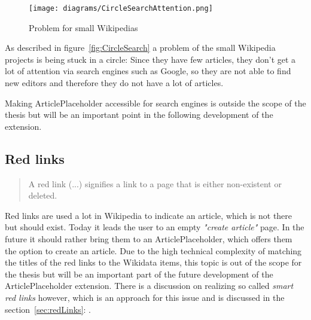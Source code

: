 \noindent\begin{minipage}{.4\textwidth}
	\begin{figure}[H]\label{fig:CircleSearch}
		\texttt{[image: diagrams/CircleSearchAttention.png]}
		\caption{Problem for small Wikipedias}
		\label{diagramCircleSearch}
	\end{figure}
	\hspace*{1cm}
\end{minipage}
\hfill
\begin{minipage}{0.5\textwidth}
		As described in figure~\ref{fig:CircleSearch} a problem of the small Wikipedia projects is being stuck in a circle: Since they have few articles, they don't get a lot of attention via search engines such as Google, so they are not able to find new editors and therefore they do not have a lot of articles.
\end{minipage}
\newline
Making ArticlePlaceholder accessible for search engines is outside the scope of the thesis but will be an important point in the following development of the extension. 

\subsection{Red links}
\begin{quotation}
A red link (...) signifies a link to a page that is either non-existent or deleted. 
\end{quotation} %

Red links are used a lot in Wikipedia to indicate an article, which is not there but should exist. Today it leads the user to an empty \textit{"create article"} page. In the future it should rather bring them to an ArticlePlaceholder, which offers them the option to create an article. Due to the high technical complexity of matching the titles of the red links to the Wikidata items, this topic is out of the scope for the thesis but will be an important part of the future development of the ArticlePlaceholder extension. There is a discussion on realizing so called \textit{smart red links} however, which is an approach for this issue and is discussed in the section~\ref{sec:redLinks}: .

